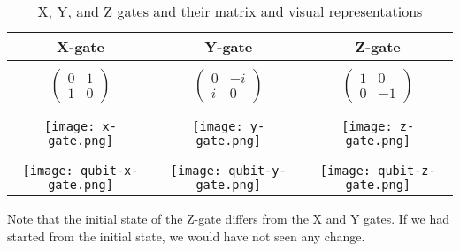 \begin{table}[H]
  \centering
  \caption{X, Y, and Z gates and their matrix and visual representations}
  \begin{tabular}{|c|c|c|} 
      \hline
      \textbf{X-gate} & \textbf{Y-gate} & \textbf{Z-gate}\\
      \hline
      &&\\[0.5pt]
      $\begin{pmatrix}
        0 & 1 \\
        1 & 0
      \end{pmatrix}$ & 
      $\begin{pmatrix}
        0 & -i \\
        i & 0
      \end{pmatrix}$ &
      $\begin{pmatrix}
        1 & 0 \\
        0 & -1
      \end{pmatrix}$\\
      &&\\[0.5pt]
      \hline
      &&\\[0.5pt]
      \texttt{[image: x-gate.png]} & \texttt{[image: y-gate.png]}  & \texttt{[image: z-gate.png]}\\
      &&\\[0.5pt]
      \hline
      &&\\[0.5pt]
      \texttt{[image: qubit-x-gate.png]} & \texttt{[image: qubit-y-gate.png]} & \texttt{[image: qubit-z-gate.png]}\\
      \hline
  \end{tabular}
  \label{tab:xyz-gates}
\end{table}
Note that the initial state of the Z-gate differs from the X and Y gates. If we had started from the initial state, we would have not seen any change.

